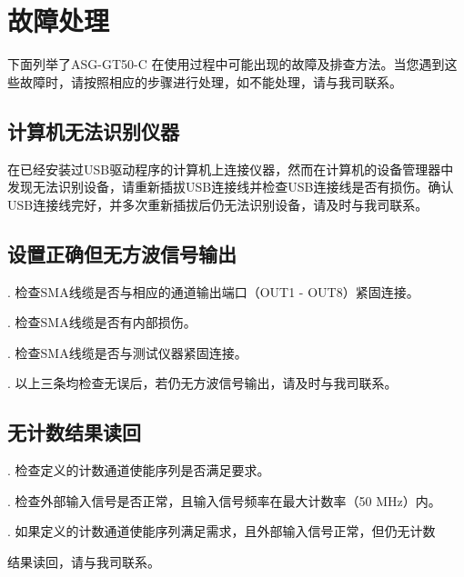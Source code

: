 \chapter{\heiti 故障处理}
下面列举了ASG-GT50-C 在使用过程中可能出现的故障及排查方法。当您遇到这些故障时，请按照相应的步骤进行处理，如不能处理，请与我司联系。

\section{\heiti 计算机无法识别仪器}
在已经安装过USB驱动程序的计算机上连接仪器，然而在计算机的设备管理器中发现无法识别设备，请重新插拔USB连接线并检查USB连接线是否有损伤。确认USB连接线完好，并多次重新插拔后仍无法识别设备，请及时与我司联系。

\section{\heiti 设置正确但无方波信号输出}
. 检查SMA线缆是否与相应的通道输出端口（OUT1 - OUT8）紧固连接。

. 检查SMA线缆是否有内部损伤。

. 检查SMA线缆是否与测试仪器紧固连接。

. 以上三条均检查无误后，若仍无方波信号输出，请及时与我司联系。


\section{\heiti 无计数结果读回}
. 检查定义的计数通道使能序列是否满足要求。

. 检查外部输入信号是否正常，且输入信号频率在最大计数率（50 MHz）内。

. 如果定义的计数通道使能序列满足需求，且外部输入信号正常，但仍无计数

\hspace{-0.5em}结果读回，请与我司联系。
